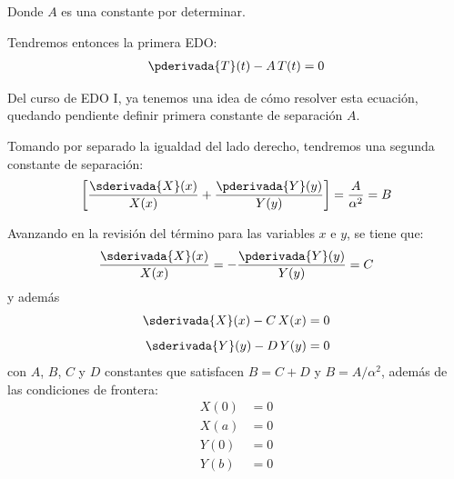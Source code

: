 Donde $A$ es una constante por determinar.

Tendremos entonces la primera EDO:
\begin{align}
\pderivada{T} (t) - A \, T (t) = 0
\label{eq:ecuacion_02_195}
\end{align}

Del curso de EDO I, ya tenemos una idea de cómo resolver esta ecuación, quedando pendiente definir primera constante de separación $A$.
\par
Tomando por separado la igualdad del lado derecho, tendremos una segunda constante de separación:
\begin{align*}
\left[ \dfrac{\sderivada{X} (x)}{X (x)} + \dfrac{\pderivada{Y} (y)}{Y (y)} \right]  = \dfrac{A}{\alpha^{2}} = B
\end{align*}    

Avanzando en la revisión del término para las variables $x$ e $y$, se tiene que:
\begin{align*}
\dfrac{\sderivada{X} (x)}{X (x)} = -  \dfrac{\pderivada{Y} (y)}{Y (y)} = C
\end{align*}
y además
\begin{align}
\sderivada{X} (x) - C \, X (x) = 0 \label{eq:ecuacion_02_196} \\[0.5em]
\sderivada{Y} (y) - D \, Y (y) = 0 \label{eq:ecuacion_02_197}
\end{align}
con $A$, $B$, $C$ y $D$ constantes que satisfacen $B = C + D$ y $B = A / \alpha^{2}$, además de las condiciones de frontera:
\begin{align}
X (0) &= 0 \label{eq:ecuacion_02_198} \\[0.5em]
X (a) &= 0 \label{eq:ecuacion_02_199} \\[0.5em]
Y (0) &= 0 \label{eq:ecuacion_02_200} \\[0.5em]
Y (b) &= 0 \label{eq:ecuacion_02_201} \\[0.5em]
\end{align}

